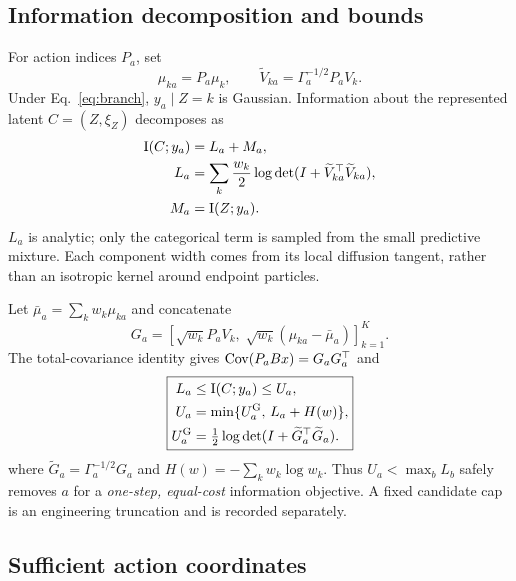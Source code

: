 \subsection{Information decomposition and bounds}

For action indices $P_a$, set
\begin{equation}
 \mu_{ka}=P_a\mu_k,\qquad
 \widetilde V_{ka}=\Gamma_a^{-1/2}P_aV_k.
\end{equation}
Under Eq.~\eqref{eq:branch},
$y_a\mid Z=k$ is Gaussian.  Information about the represented latent
$C=(Z,\xi_Z)$ decomposes as
\begin{align}
 \mathrm{I}(C;y_a)
 &=L_a+M_a, \label{eq:mi-decomposition}\\
 L_a
 &=\sum_k\frac{w_k}{2}
   \log\det(I+\widetilde V_{ka}^{\top}\widetilde V_{ka}),\\
 M_a&=\mathrm{I}(Z;y_a).
\end{align}
$L_a$ is analytic; only the categorical term is sampled from the small
predictive mixture.  Each component width comes from its local diffusion
tangent, rather than an isotropic kernel around endpoint particles.

Let $\bar\mu_a=\sum_kw_k\mu_{ka}$ and concatenate
\begin{equation}
 G_a=\left[
   \sqrt{w_k}P_aV_k,\;
   \sqrt{w_k}(\mu_{ka}-\bar\mu_a)
 \right]_{k=1}^K.
\end{equation}
The total-covariance identity gives $\operatorname{Cov}(P_aBx)=G_aG_a^\top$ and
\begin{equation}
 \boxed{\begin{aligned}
 L_a&\leq \mathrm{I}(C;y_a)\leq U_a,\\
 U_a&=\min\{U_a^{\rm G},\,L_a+H(w)\},\\
 U_a^{\rm G}&=\tfrac12\log\det
 (I+\widetilde G_a^\top\widetilde G_a).
 \end{aligned}}
 \label{eq:sandwich}
\end{equation}
where $\widetilde G_a=\Gamma_a^{-1/2}G_a$ and
$H(w)=-\sum_kw_k\log w_k$.  Thus $U_a<\max_bL_b$ safely removes $a$ for a
\emph{one-step, equal-cost} information objective.  A fixed candidate cap is
an engineering truncation and is recorded separately.

\subsection{Sufficient action coordinates}


